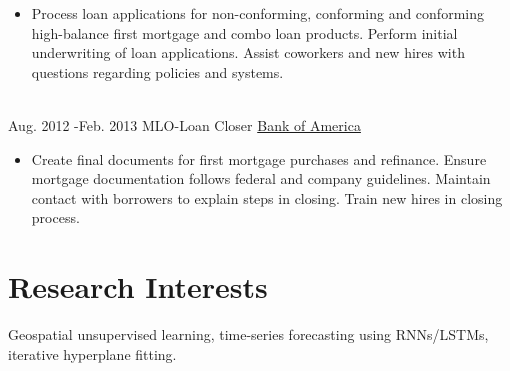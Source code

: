 \documentclass[letterpaper]{twentysecondcv} %
\begin{document}
\begin{twenty}
{\begin{itemize}
        	\item Process loan applications for non-conforming, conforming and conforming high-balance first mortgage and combo loan products. Perform initial underwriting of loan applications. Assist coworkers and new hires with questions regarding policies and systems.
	    \end{itemize}
    	}
    \\
	\twentyitem
		{Aug. 2012 -}{Feb. 2013}
		{MLO-Loan Closer}
		{\href{https://www.bankofamerica.com/}{Bank of America}}
		{}
		{
		\begin{itemize}
			\item Create final documents for first mortgage purchases and refinance. Ensure mortgage documentation follows federal and company guidelines. Maintain contact with borrowers to explain steps in closing. Train new hires in closing process.
		\end{itemize}
		}
        
\end{twenty}

\section{Research Interests}
Geospatial unsupervised learning, time-series forecasting using RNNs/LSTMs, iterative hyperplane fitting.

\end{document}
